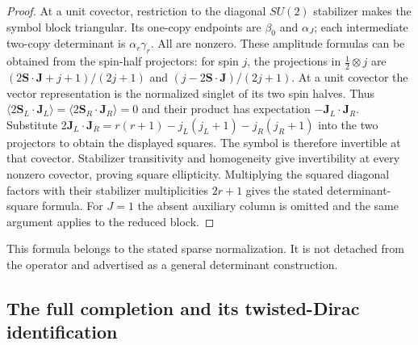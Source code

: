 \documentclass[11pt]{article}
\theoremstyle{definition}
\begin{document}
\begin{proof}
At a unit covector, restriction to the diagonal $SU(2)$ stabilizer makes the
symbol block triangular. Its one-copy endpoints are $\beta_0$ and
$\alpha_J$; each intermediate two-copy determinant is $\alpha_r\gamma_r$.
All are nonzero. These amplitude formulas can be obtained from the
spin-half projectors: for spin $j$, the projections in
$\tfrac12\otimes j$ are $(2\boldsymbol S\cdot\boldsymbol J+j+1)/(2j+1)$
and $(j-2\boldsymbol S\cdot\boldsymbol J)/(2j+1)$. At a unit covector
the vector representation is the normalized singlet of its two spin halves.
Thus $\langle2\boldsymbol S_L\cdot\boldsymbol J_L\rangle=
\langle2\boldsymbol S_R\cdot\boldsymbol J_R\rangle=0$ and their product
has expectation $-\boldsymbol J_L\cdot\boldsymbol J_R$.
Substitute $2\boldsymbol J_L\cdot\boldsymbol J_R=
r(r+1)-j_L(j_L+1)-j_R(j_R+1)$ into the two projectors to obtain the displayed
squares. The symbol is therefore invertible at that
covector.  Stabilizer transitivity and homogeneity give invertibility at every
nonzero covector, proving square ellipticity.  Multiplying the squared
diagonal factors with their stabilizer multiplicities $2r+1$ gives the stated
determinant-square formula.  For $J=1$ the absent auxiliary column is omitted
and the same argument applies to the reduced block.
\end{proof}

This formula belongs to the stated sparse normalization.  It is not detached
from the operator and advertised as a general determinant construction.

\subsection{The full completion and its twisted-Dirac identification}
\end{document}
